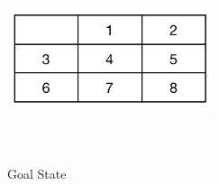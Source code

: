 \documentclass{svproc}
\begin{document}
\begin{figure}
	\centering
	\includegraphics[width=6cm,height=6cm,keepaspectratio]{GoalState.png}
	\caption{Goal State}
	\label{fig:1}       %
\end{figure}
\end{document}
